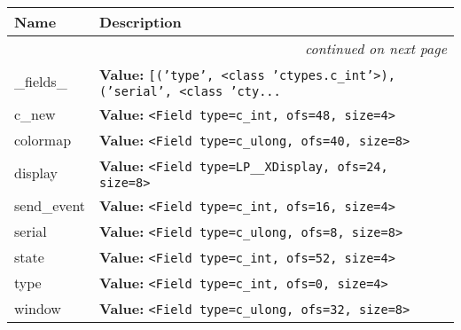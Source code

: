     \vspace{-1cm}
\hspace{\varindent}\begin{longtable}{|p{\varnamewidth}|p{\vardescrwidth}|l}
\cline{1-2}
\cline{1-2} \centering \textbf{Name} & \centering \textbf{Description}& \\
\cline{1-2}
\endhead\cline{1-2}\multicolumn{3}{r}{\small\textit{continued on next page}}\\\endfoot\cline{1-2}
\endlastfoot\raggedright \_\-f\-i\-e\-l\-d\-s\-\_\- & \raggedright \textbf{Value:} 
{\tt \texttt{[}\texttt{(}\texttt{'}\texttt{type}\texttt{'}\texttt{, }{\textless}class 'ctypes.c\_int'{\textgreater}\texttt{)}\texttt{, }\texttt{(}\texttt{'}\texttt{serial}\texttt{'}\texttt{, }{\textless}class 'cty\texttt{...}}&\\
\cline{1-2}
\raggedright c\-\_\-n\-e\-w\- & \raggedright \textbf{Value:} 
{\tt {\textless}Field type=c\_int, ofs=48, size=4{\textgreater}}&\\
\cline{1-2}
\raggedright c\-o\-l\-o\-r\-m\-a\-p\- & \raggedright \textbf{Value:} 
{\tt {\textless}Field type=c\_ulong, ofs=40, size=8{\textgreater}}&\\
\cline{1-2}
\raggedright d\-i\-s\-p\-l\-a\-y\- & \raggedright \textbf{Value:} 
{\tt {\textless}Field type=LP\_\_XDisplay, ofs=24, size=8{\textgreater}}&\\
\cline{1-2}
\raggedright s\-e\-n\-d\-\_\-e\-v\-e\-n\-t\- & \raggedright \textbf{Value:} 
{\tt {\textless}Field type=c\_int, ofs=16, size=4{\textgreater}}&\\
\cline{1-2}
\raggedright s\-e\-r\-i\-a\-l\- & \raggedright \textbf{Value:} 
{\tt {\textless}Field type=c\_ulong, ofs=8, size=8{\textgreater}}&\\
\cline{1-2}
\raggedright s\-t\-a\-t\-e\- & \raggedright \textbf{Value:} 
{\tt {\textless}Field type=c\_int, ofs=52, size=4{\textgreater}}&\\
\cline{1-2}
\raggedright t\-y\-p\-e\- & \raggedright \textbf{Value:} 
{\tt {\textless}Field type=c\_int, ofs=0, size=4{\textgreater}}&\\
\cline{1-2}
\raggedright w\-i\-n\-d\-o\-w\- & \raggedright \textbf{Value:} 
{\tt {\textless}Field type=c\_ulong, ofs=32, size=8{\textgreater}}&\\
\cline{1-2}
\end{longtable}



